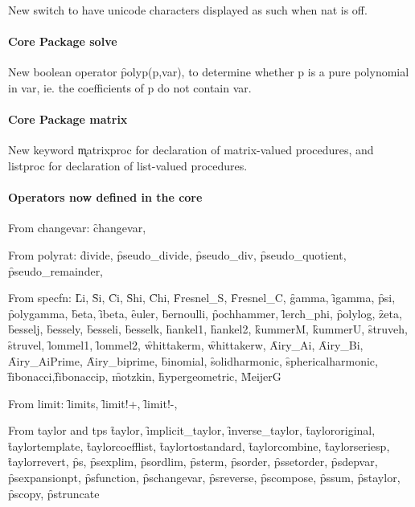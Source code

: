 New switch  to have unicode characters
displayed as such when nat is off.

\paragraph*{Core Package solve}

New boolean operator \f{polyp}(p,var), to determine whether p is a pure polynomial
in var, ie. the coefficients of p do not contain var.

\paragraph*{Core Package matrix}

New keyword \k{matrixproc} for declaration of matrix-valued procedures, and listproc for declaration of list-valued procedures.

\paragraph*{Operators now defined in the \REDUCE core}

From changevar: \f{changevar},

From polyrat: \f{divide}, \f{pseudo\_divide}, \f{pseudo\_div}, \f{pseudo\_quotient}, \f{pseudo\_remainder},

From specfn: 
\f{Li}, \f{Si}, \f{Ci}, \f{Shi}, \f{Chi},
\f{Fresnel\_S}, \f{Fresnel\_C},
\f{gamma}, \f{igamma}, \f{psi}, \f{polygamma}, \f{beta}, \f{ibeta},
\f{euler},
\f{bernoulli}, \f{pochhammer}, \f{lerch\_phi}, \f{polylog}, \f{zeta}, 
\f{besselj},
\f{bessely},
\f{besseli},
\f{besselk},
\f{hankel1},
\f{hankel2},
\f{kummerM},
\f{kummerU},
\f{struveh},
\f{struvel},
\f{lommel1},
\f{lommel2},
\f{whittakerm},
\f{whittakerw},
\f{Airy\_Ai},
\f{Airy\_Bi},
\f{Airy\_AiPrime},
\f{Airy\_biprime},
\f{binomial},
\f{solidharmonic},
\f{sphericalharmonic},
\f{fibonacci},\f{fibonaccip},
\f{motzkin},
\f{hypergeometric}, \f{MeijerG}

From limit: 
\f{limits}, \f{limit!+}, \f{limit!-},

From taylor and tps
\f{taylor}, \f{implicit\_taylor}, \f{inverse\_taylor},
\f{taylororiginal}, \f{taylortemplate}, \f{taylorcoefflist}, \f{taylortostandard}, \f{taylorcombine}, \f{taylorseriesp},
\f{taylorrevert},
\f{ps}, 
\f{psexplim}, \f{psordlim}, \f{psterm}, \f{psorder}, \f{pssetorder}, \f{psdepvar}, \f{psexpansionpt},
\f{psfunction}, \f{pschangevar}, \f{psreverse}, \f{pscompose}, \f{pssum}, \f{pstaylor}, \f{pscopy}, \f{pstruncate}

